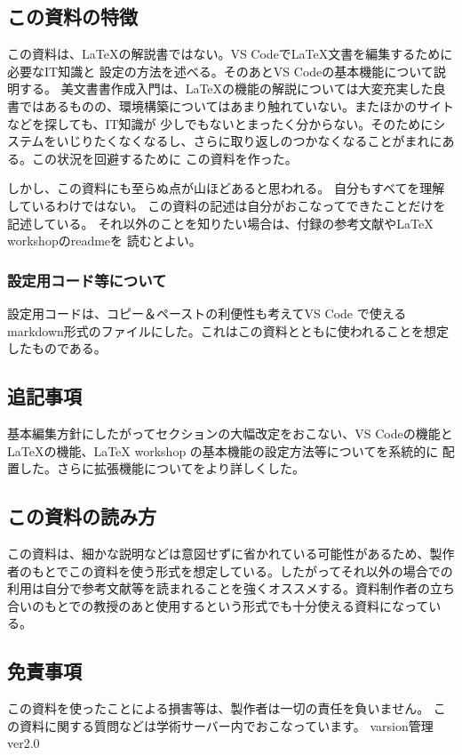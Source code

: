 \documentclass{ltjsarticle}
\begin{document}
\subsection{この資料の特徴}
この資料は、\LaTeX の解説書ではない。VS Codeで\LaTeX 文書を編集するために必要なIT知識と
設定の方法を述べる。そのあとVS Codeの基本機能について説明する。
美文書書作成入門\cite{美文書本}は、\LaTeX の機能の解説については大変充実した良書ではあるものの、環境構築についてはあまり触れていない。またほかのサイトなどを探しても、IT知識が
少しでもないとまったく分からない。そのためにシステムをいじりたくなくなるし、さらに取り返しのつかなくなることがまれにある。この状況を回避するために
この資料を作った。

しかし、この資料にも至らぬ点が山ほどあると思われる。
自分もすべてを理解しているわけではない。
この資料の記述は自分がおこなってできたことだけを記述している。
それ以外のことを知りたい場合は、付録の参考文献やLaTeX workshopのreadmeを
読むとよい。

\subsubsection{設定用コード等について}
設定用コードは、コピー＆ペーストの利便性も考えてVS Code で使えるmarkdown形式のファイルにした。これはこの資料とともに使われることを想定したものである。

\subsection{追記事項}
基本編集方針にしたがってセクションの大幅改定をおこない、VS Codeの機能と
\LaTeX の機能、LaTeX workshop の基本機能の設定方法等についてを系統的に
配置した。さらに拡張機能についてをより詳しくした。

\subsection{この資料の読み方}
この資料は、細かな説明などは意図せずに省かれている可能性があるため、製作者のもとでこの資料を使う形式を想定している。したがってそれ以外の場合での利用は自分で参考文献等を読まれることを強くオススメする。資料制作者の立ち合いのもとでの教授のあと使用するという形式でも十分使える資料になっている。

\subsection{免責事項}
この資料を使ったことによる損害等は、製作者は一切の責任を負いません。
この資料に関する質問などは学術サーバー内でおこなっています。
varsion管理  ver2.0
\end{document}

